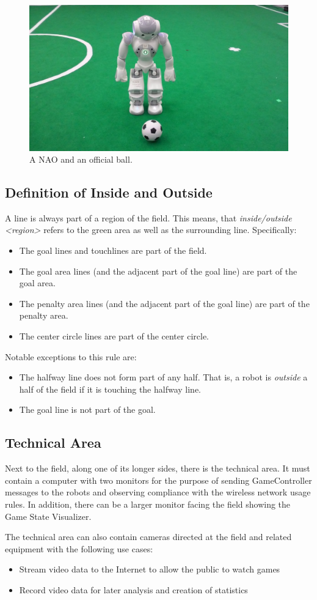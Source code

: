 \begin{figure}[t]
  \centerline{\includegraphics[height=0.28\columnwidth]{figs/robotWithBall2016.jpg}}
  \caption{A NAO and an official ball.}
  \label{fig:ball}
\end{figure}

\subsection{Definition of Inside and Outside}
\label{sec:inside_outside}

A line is always part of a region of the field.
This means, that \emph{inside/outside \textless region\textgreater} refers to the green area as well as the surrounding line.
Specifically:
\begin{itemize}
  \item The goal lines and touchlines are part of the field.
  \item The goal area lines (and the adjacent part of the goal line) are part of the goal area.
  \item The penalty area lines (and the adjacent part of the goal line) are part of the penalty area.
  \item The center circle lines are part of the center circle.
\end{itemize}

Notable exceptions to this rule are:
\begin{itemize}
  \item The halfway line does not form part of any half.
    That is, a robot is \textit{outside} a half of the field if it is touching the halfway line.
  \item The goal line is not part of the goal.
\end{itemize}

\subsection{Technical Area}
\label{sec:technical_area}

Next to the field, along one of its longer sides, there is the technical area.
It must contain a computer with two monitors for the purpose of sending GameController messages to the robots and observing compliance with the wireless network usage rules.
In addition, there can be a larger monitor facing the field showing the Game State Visualizer.

The technical area can also contain cameras directed at the field and related equipment with the following use cases:
\begin{itemize}
  \item Stream video data to the Internet to allow the public to watch games
  \item Record video data for later analysis and creation of statistics
\end{itemize}
